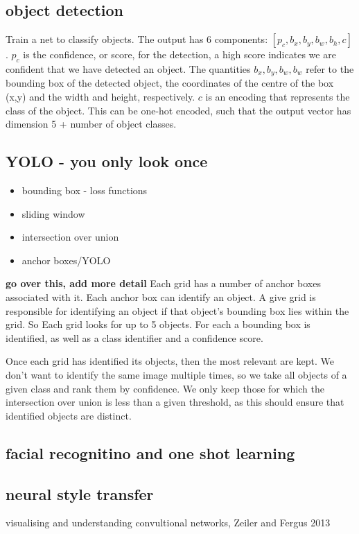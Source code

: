 \documentclass{article}
\begin{document}
\subsection{object detection}
Train a net to classify objects. The output has 6 components: $[p_c, b_x, b_y, b_w, b_h, c]$. $p_c$ is the confidence, or score, for the detection, a high score indicates we are confident that we have detected an object. The quantities $b_x, b_y, b_w, b_w$ refer to the bounding box of the detected object, the coordinates of the centre of the box (x,y) and the width and height, respectively. $c$ is an encoding that represents the class of the object. This can be one-hot encoded, such that the output vector has dimension 5 + number of object classes.



\subsection{YOLO - you only look once}
\begin{itemize}
	\item bounding box - loss functions
	\item sliding window
	\item intersection over union
	\item anchor boxes/YOLO
\end{itemize}
{\bf go over this, add more detail}
Each grid has a number of anchor boxes associated with it. Each anchor box can identify an object. A give grid is responsible for identifying an object if that object's bounding box lies within the grid.
So Each grid looks for up to 5 objects. For each a bounding box is identified, as well as a class identifier and a confidence score. 

Once each grid has identified its objects, then the most relevant are kept. We don't want to identify the same image multiple times, so we take all objects of a given class and rank them by confidence. We only keep those for which the intersection over union is less than a given threshold, as this should ensure that identified objects are distinct.

\subsection{facial recognitino and one shot learning}


\subsection{neural style transfer}
visualising and understanding convultional networks, Zeiler and Fergus 2013
\end{document}
